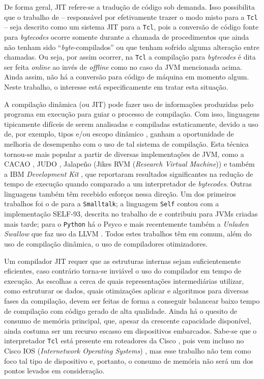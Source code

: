De forma geral, JIT refere-se a tradução de código sob demanda. Isso
possibilita que o trabalho de  -- responsável
por efetivamente trazer o modo misto para a \texttt{Tcl} -- seja descrito
como um sistema JIT para a \texttt{Tcl}, pois a conversão de código
fonte para \textit{bytecodes} ocorre somente durante a chamada de
procedimentos que ainda não tenham sido ``\textit{byte}-compilados''
ou que tenham sofrido alguma alteração entre chamadas. Ou seja, por
assim ocorrer, na
\texttt{Tcl} a compilação para \textit{bytecodes} é dita ser feita
\textit{online} ao invés de
\textit{offline} como no caso da JVM
mencionada acima. Ainda assim, não
há a conversão para código de máquina em momento algum. Neste
trabalho, o interesse está especificamente em tratar esta situação.

A compilação dinâmica (ou JIT) pode fazer uso de informações produzidas
pelo programa em execução para guiar o processo de compilação. Com
isso, linguagens tipicamente difíceis de serem analisadas e compiladas
estaticamente, devido a uso de, por exemplo, tipos e/ou
escopo dinâmico \cite{holzle}, %
 ganham a oportunidade de melhoria de desempenho com
o uso de tal sistema de compilação. Esta técnica tornou-se mais popular a
partir de diversas implementações de JVM, como a
CACAO \cite{cacao}, JUDO \cite{judo},
Jalapeño (Jikes RVM (\textit{Research Virtual
  Machine})) 
\cite{jalapeno_1} e também a IBM \textit{Development Kit}
\cite{suganuma_ibm}, que reportaram resultados
significantes na redução de tempo de execução quando comparado a um
interpretador de \textit{bytecodes}. Outras linguagens também têm
recebido esforços nessa direção. Um dos primeiros trabalhos foi o de
 para a \texttt{Smalltalk}; a
linguagem \texttt{Self} contou com a implementação SELF-93, descrita
no trabalho de  e contribuiu para JVMs criadas mais
tarde; para o
\texttt{Python} há o Psyco
\cite{psyco} e mais recentemente também a \textit{Unladen Swallow}
que faz uso da LLVM \cite{llvm1}
.
Todos estes trabalhos têm em comum,
além do uso de compilação dinâmica, o uso de
compiladores otimizadores.

Um compilador JIT requer que as estruturas internas sejam
suficientemente eficientes, caso contrário torna-se inviável o
uso do compilador em tempo de execução. As escolhas a
cerca de quais representações intermediárias utilizar, como estruturar
os dados, quais otimizações aplicar e algoritmos para diversas fases da
compilação, devem ser feitas de forma a conseguir balancear baixo
tempo de compilação com código gerado de alta qualidade. Ainda há o
quesito de consumo de memória principal, que, apesar da crescente
capacidade disponível, ainda costuma ser um recurso escasso em
dispositivos embarcados. Sabe-se que o interpretador \texttt{Tcl} está
presente em roteadores da Cisco \cite{cisco}, pois vem incluso no Cisco IOS
(\textit{Internetwork Operating Systems}) \cite{cisco_ios}, mas esse trabalho
não tem como foco tal tipo de dispositivo e, portanto, o consumo de
memória não será um dos pontos levados em consideração.

